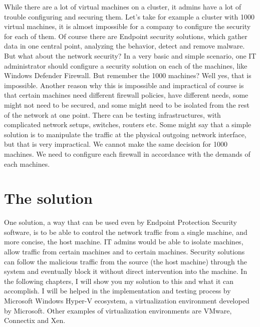 While there are a lot of virtual machines on a cluster, it admins have a lot of trouble configuring and securing them. Let’s take for example a cluster with 1000 virtual 
machines, it is almost impossible for a company to configure the security for each of them. Of course there are Endpoint security solutions, which gather data in one central point, 
analyzing the behavior, detect and remove malware. But what about the network security? In a very basic and simple scenario, one IT administrator should configure a security solution 
on each of the machines, like Windows Defender Firewall. But remember the 1000 machines? Well yes, that is impossible. Another reason why this is impossible and impractical of course 
is that certain machines need different firewall policies, have different needs, some might not need to be secured, and some might need to be isolated from the rest of the network at 
one point. There can be testing infrastructures, with complicated network setups, switches, routers etc. Some might say that a simple solution is to manipulate the traffic at the 
physical outgoing network interface, but that is very impractical. We cannot make the same decision for 1000 machines. We need to configure each firewall in accordance with the demands 
of each machines. 

\vspace{5mm}
\section{The solution}
\vspace{5mm}

One solution, a way that can be used even by Endpoint Protection Security software, is to be able to control the network traffic from a single machine, and more concise, 
the host machine. IT admins would be able to isolate machines, allow traffic from certain machines and to certain machines. Security solutions can follow the malicious traffic from 
the source (the host machine) through the system and eventually block it without direct intervention into the machine. In the following chapters, I will show you my solution to this 
and what it can accomplish. I will be helped in the implementation and testing process by Microsoft Windows Hyper-V ecosystem, a virtualization environment developed by Microsoft. 
Other examples of virtualization environments are VMware, Connectix and Xen.
